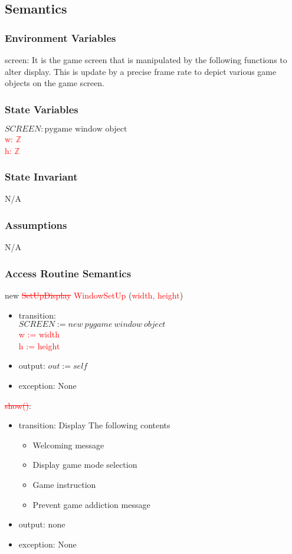 \documentclass[12pt]{article}
\begin{document}
\subsection*{Semantics}
\subsubsection*{Environment Variables}
screen: It is the game screen that is manipulated by the following functions to alter display. This is update by a precise frame rate to depict various game objects on the game screen.

\subsubsection*{State Variables}
$SCREEN : \text{pygame window object}$\\
\textcolor{red}{w: $\mathbb{Z}$}\\
\textcolor{red}{h: $\mathbb{Z}$}

\subsubsection*{State Invariant}
N/A
\subsubsection*{Assumptions}
N/A
\subsubsection*{Access Routine Semantics}

new \textcolor{red}{\st{SetUpDisplay} WindowSetUp }(\textcolor{red}{width, height})
\begin{itemize}
    \item transition: \\$SCREEN := new\ pygame\ window\ object$\\ \textcolor{red}{w := width}\\ \textcolor{red}{h := height} 
    \item output: $out := self$
    \item exception: None
\end{itemize}

\noindent \textcolor{red}{\st{show()}}:
\begin{itemize}
    \item transition: Display The following contents
    \begin{itemize}
    \item Welcoming message
    \item Display game mode selection
    \item Game instruction
    \item Prevent game addiction message
    \end{itemize}
    \item output: none
    \item exception: None
\end{itemize}
\end{document}
